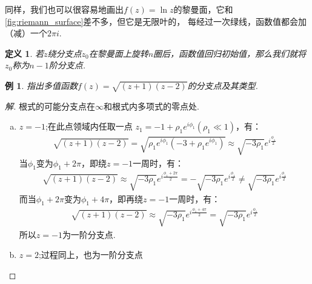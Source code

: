 \documentclass[12pt, a4paper]{ctexbook}
\newtheorem{definition}{定义}[chapter] %
\newtheorem{example}{例}[chapter] %
\begin{document}
                同样，我们也可以很容易地画出$f(z) = \ln{z}$的黎曼面，它和\ref{fig:riemann_surface}差不多，但它是无限叶的，
                每经过一次绿线，函数值都会加（减）一个$2\pi i$.

                \begin{definition}
                    若$z$绕分支点$z_0$在黎曼面上旋转$n$圈后，函数值回归初始值，那么我们就将$z_0$称为$n - 1$阶分支点.
                \end{definition}

                \begin{example}
                    \label{ex:riemann_surface}
                    指出多值函数$f(z) = \sqrt{(z + 1)(z - 2)}$的分支点及其类型.
                \end{example}
                \begin{proof}[解]
                    根式的可能分支点在$\infty$和根式内多项式的零点处.
                    \begin{enumerate}[(a)]
                        \item $z = -1$;在此点领域内任取一点 $z_1 = -1 + \rho_1 e^{i \phi_1}(\rho_1 \ll 1)$，有：
                            \begin{align*}
                                \sqrt{(z + 1)(z - 2)} = \sqrt{\rho_1 e^{i \phi_1}(-3 + \rho_1 e^{i \phi_1})} 
                                \approx \sqrt{-3 \rho_1}e^{i\frac{\phi_1}{2}}
                            \end{align*}
                            当$\phi_1$变为$\phi_1 + 2\pi$，即绕$z = -1$一周时，有：
                            \begin{align*}
                                \sqrt{(z + 1)(z - 2)} \approx \sqrt{-3 \rho_1}e^{i\frac{\phi_1 + 2\pi}{2}}
                                = -\sqrt{-3 \rho_1}e^{i\frac{\phi_1}{2}}
                                \neq \sqrt{-3 \rho_1}e^{i\frac{\phi_1}{2}}
                            \end{align*}
                            而当$\phi_1 + 2\pi$变为$\phi_1 + 4\pi$，即再绕$z = -1$一周时，有：
                            \begin{align*}
                                \sqrt{(z + 1)(z - 2)} \approx \sqrt{-3 \rho_1}e^{i\frac{\phi_1 + 4\pi}{2}}
                                = \sqrt{-3 \rho_1}e^{i\frac{\phi_1}{2}}
                            \end{align*}
                            所以$z = -1$为一阶分支点.
                        \item $z = 2$;过程同上，也为一阶分支点

\end{enumerate}
\end{proof}
\end{document}
